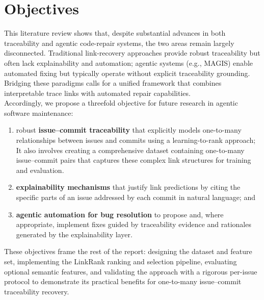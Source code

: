 \section{Objectives}

This literature review shows that, despite substantial advances in both traceability and agentic code-repair systems, the two areas remain largely disconnected. Traditional link-recovery approaches provide robust traceability but often lack explainability and automation; agentic systems (e.g., MAGIS) enable automated fixing but typically operate without explicit traceability grounding. Bridging these paradigms calls for a unified framework that combines interpretable trace links with automated repair capabilities.\\

\noindent
Accordingly, we propose a threefold objective for future research in agentic software maintenance:

\begin{enumerate}
    \item robust \textbf{issue--commit traceability} that explicitly models one-to-many relationships between issues and commits using a learning-to-rank approach; It also involves creating a comprehensive dataset containing one-to-many issue–commit pairs that captures these complex link structures for training and evaluation.
    \item \textbf{explainability mechanisms} that justify link predictions by citing the specific parts of an issue addressed by each commit in natural language; and
    \item \textbf{agentic automation for bug resolution} to propose and, where appropriate, implement fixes guided by traceability evidence and rationales generated by the explainability layer.
\end{enumerate}
\begin{center}
\begingroup
\setlength{\fboxsep}{6pt}%
\endgroup
\end{center}

These objectives frame the rest of the report: designing the dataset and feature set, implementing the LinkRank ranking and selection pipeline, evaluating optional semantic features, and validating the approach with a rigorous per-issue protocol to demonstrate its practical benefits for one-to-many issue--commit traceability recovery.\\

